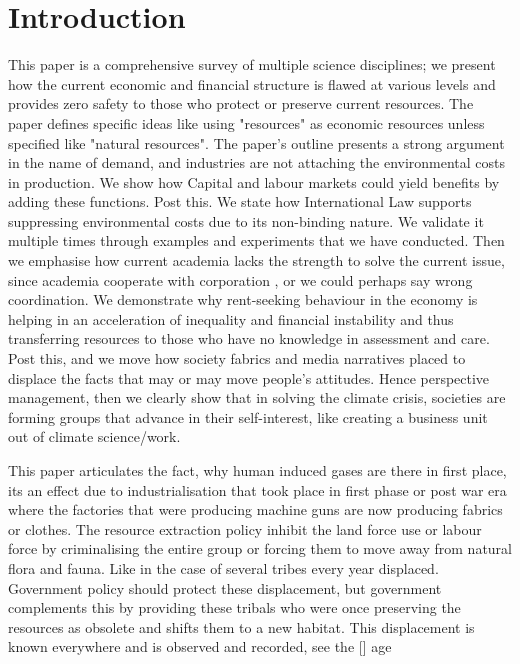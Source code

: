 \documentclass[11pt]{article}
\begin{document}
\maketitle	
\pagebreak



\section{Introduction}

This paper is a comprehensive survey of multiple science disciplines; we present how the current economic and financial structure is flawed at various levels and provides zero safety to those who protect or preserve current resources. The paper defines specific ideas like using "resources" as economic resources unless specified like "natural resources". The paper's outline presents a strong argument in the name of demand, and industries are not attaching the environmental costs in production. We show how Capital and labour markets could yield benefits by adding these functions. Post this. We state how International Law supports suppressing environmental costs due to its non-binding nature. We validate it multiple times through examples and experiments that we have conducted. Then we emphasise how current academia lacks the strength to solve the current issue, since academia cooperate with corporation , or we could perhaps say wrong coordination. We demonstrate why rent-seeking behaviour in the economy is helping in an acceleration of inequality and financial instability and thus transferring resources to those who have no knowledge in assessment and care. Post this, and we move how society fabrics and media narratives placed to displace the facts that may or may move people's attitudes. Hence perspective management, then we clearly show that in solving the climate crisis, societies are forming groups that advance in their self-interest, like creating a business unit out of climate science/work.

This paper articulates the fact, why human induced gases are there in first place, its an effect due to industrialisation that took place in first phase or post war era where the factories that were producing machine guns are now producing fabrics or clothes. The resource extraction policy inhibit the land force use or labour force by criminalising the entire group or forcing them to move away from natural flora and fauna. Like in the case of several tribes every year displaced. Government policy should protect these displacement, but government complements this by providing these tribals who were once preserving the resources as obsolete and shifts them to a new habitat. This displacement is known everywhere and is observed and recorded, see the [] age 
\end{document}
